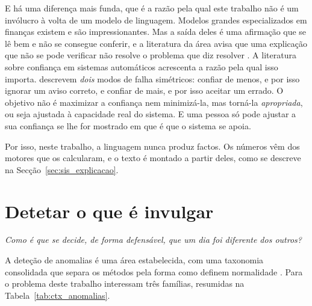 E há uma diferença mais funda, que é a razão pela qual este trabalho não é um invólucro à volta de um
modelo de linguagem. Modelos grandes especializados em finanças existem
\autocite{wu2023bloomberggpt} e são impressionantes. Mas a saída deles é uma afirmação que se lê bem
e não se consegue conferir, e a literatura da área avisa que uma explicação que não se pode verificar
não resolve o problema que diz resolver \autocite{lipton2018mythos, rudin2019stop}. A literatura
sobre confiança em sistemas automáticos acrescenta a razão pela qual isso importa.
\textcite{lee2004trust} descrevem \emph{dois} modos de falha simétricos: confiar de menos, e por isso
ignorar um aviso correto, e confiar de mais, e por isso aceitar um errado. O objetivo não é maximizar
a confiança nem minimizá-la, mas torná-la \emph{apropriada}, ou seja ajustada à capacidade real do
sistema. E uma pessoa só pode ajustar a sua confiança se lhe for mostrado em que é que o sistema se
apoia.

Por isso, neste trabalho, a linguagem nunca produz factos. Os números vêm dos motores que os
calcularam, e o texto é montado a partir deles, como se descreve na
Secção~\ref{sec:sis_explicacao}.

\section{Detetar o que é invulgar}
\label{sec:ctx_anomalias}

\emph{Como é que se decide, de forma defensável, que um dia foi diferente dos outros?}

A deteção de anomalias é uma área estabelecida, com uma taxonomia consolidada que separa os métodos
pela forma como definem normalidade \autocite{chandola2009anomaly, pang2021deep}. Para o problema
deste trabalho interessam três famílias, resumidas na Tabela~\ref{tab:ctx_anomalias}.

